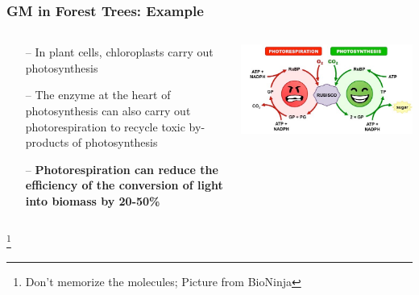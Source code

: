 \documentclass[xcolor=dvipsnames]{beamer}
\newcommand\blfootnote[1]{%
	\begingroup
	\renewcommand\thefootnote{}\footnote{#1}%
	\addtocounter{footnote}{-1}%
	\endgroup
}
\begin{document}
\begin{frame}
	\frametitle{GM in Forest Trees: Example}
	
	
	\begin{columns}
		\begin{column}{0.5\textwidth}
			\begin{itemize}
				\item[--] In plant cells, chloroplasts carry out photosynthesis
				\item[--] The enzyme at the heart of photosynthesis can also carry out photorespiration to recycle toxic by-products of photosynthesis
				\item[--] \textbf{Photorespiration can reduce the efficiency of the conversion of light into biomass by 20-50\%} 
			\end{itemize}
		\end{column}
		\begin{column}{0.5\textwidth}
						\centering	\includegraphics[keepaspectratio, width  = \textwidth]{img/photorespiration}
						\vspace{15pt}

		\end{column}
	\end{columns}
\blfootnote{Don't memorize the molecules; Picture from BioNinja}
	
\end{frame}
\end{document}
